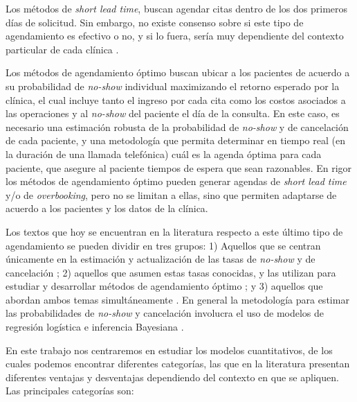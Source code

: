 Los métodos de \textit{short lead time}, buscan agendar citas dentro de los dos primeros días de solicitud. Sin embargo, no existe consenso sobre si este tipo de agendamiento es efectivo o no, y si lo fuera, sería muy dependiente del contexto particular de cada clínica \cite{daggy2010}.


Los métodos de agendamiento óptimo buscan ubicar a los pacientes de acuerdo a su probabilidad de \textit{no-show} individual maximizando el retorno esperado por la clínica, el cual incluye tanto el ingreso por cada cita como los costos asociados a las operaciones y al \textit{no-show} del paciente el día de la consulta. En este caso, es necesario una estimación robusta de la probabilidad de \textit{no-show} y de cancelación de cada paciente, y una metodología que permita determinar en tiempo real (en la duración de una llamada telefónica) cuál es la agenda óptima para cada paciente, que asegure al paciente tiempos de espera que sean razonables. En rigor los métodos de agendamiento óptimo pueden generar agendas de \textit{short lead time} y/o de \textit{overbooking}, pero no se limitan a ellas, sino que permiten adaptarse de acuerdo a los pacientes y los datos de la clínica.

Los textos que hoy se encuentran en la literatura respecto a este último tipo de agendamiento se pueden dividir en tres grupos: 1) Aquellos que se centran únicamente en la estimación y actualización de las tasas de \textit{no-show} y de cancelación \cite{alaeddini2011, alaeddini2015}; 2)  aquellos que asumen estas tasas conocidas, y las utilizan para estudiar y desarrollar métodos de agendamiento óptimo \cite{zeng2010, cayirli2003, liu2010, muthuraman2008}; y 3) aquellos que abordan ambos temas simultáneamente \cite{daggy2010, glowacka2009, goldman1982}. En general la metodología para estimar las probabilidades de \textit{no-show} y cancelación involucra el uso de modelos de regresión logística e inferencia Bayesiana \cite{alaeddini2015}.


En este trabajo nos centraremos en estudiar los modelos cuantitativos, de los cuales podemos encontrar diferentes categorías, las que en la literatura presentan diferentes ventajas y desventajas dependiendo del contexto en que se apliquen. Las principales categorías son:

